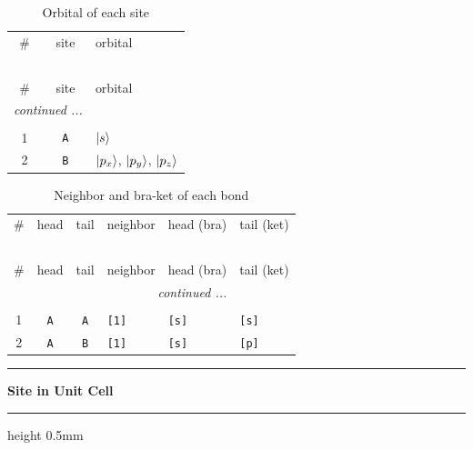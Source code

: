 \documentclass[fleqn,10pt,landscape]{jsarticle}
\begin{document}
\renewcommand{\arraystretch}{1.6}
\begin{longtable}[l]{ccl}
\captionsetup{justification=raggedright, singlelinecheck=off}
\caption{Orbital of each site}
 \\
 \hline \hline
\# & site & orbital \\ \hline \endfirsthead

\multicolumn{2}{l}{\tablename\ \thetable{}} \\
 \hline \hline
\# & site & orbital \\ \hline \endhead

 \hline \hline
\multicolumn{2}{r}{\footnotesize\it continued ...} \\ \endfoot

 \hline \hline
\multicolumn{2}{r}{} \\ \endlastfoot

1 & \texttt{A} & $\ket{s}$ \\ \hline
2 & \texttt{B} & $\ket{p_{x}}$, $\ket{p_{y}}$, $\ket{p_{z}}$ \\
\end{longtable}
\renewcommand{\arraystretch}{1.6}
\begin{longtable}[l]{ccclll}
\captionsetup{justification=raggedright, singlelinecheck=off}
\caption{Neighbor and bra-ket of each bond}
 \\
 \hline \hline
\# & head & tail & neighbor & head (bra) & tail (ket) \\ \hline \endfirsthead

\multicolumn{5}{l}{\tablename\ \thetable{}} \\
 \hline \hline
\# & head & tail & neighbor & head (bra) & tail (ket) \\ \hline \endhead

 \hline \hline
\multicolumn{5}{r}{\footnotesize\it continued ...} \\ \endfoot

 \hline \hline
\multicolumn{5}{r}{} \\ \endlastfoot

1 & \texttt{A} & \texttt{A} & \texttt{[1]} & \texttt{[s]} & \texttt{[s]} \\ \hline
2 & \texttt{A} & \texttt{B} & \texttt{[1]} & \texttt{[s]} & \texttt{[p]} \\
\end{longtable}
\vspace{5mm}
\noindent \rule[0.5mm]{5mm}{0.5mm}\hspace{3mm}\textbf{Site in Unit Cell}\hspace{3mm}\leaders\hrule height 0.5mm\hfill\kern0pt
\vspace{3mm}
\end{document}
